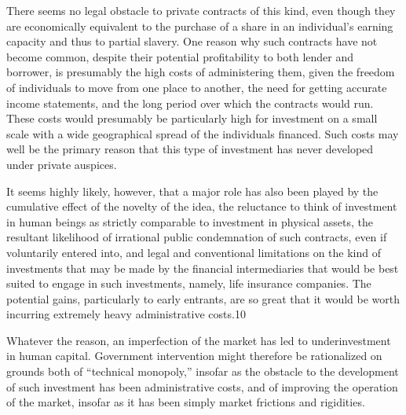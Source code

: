 \documentclass[11pt,openany]{book}
\begin{document}
There seems no legal obstacle to private contracts of this kind, even though they are economically equivalent to the purchase of a share in an individual's earning capacity and thus to partial slavery. One reason why such contracts have not become common, despite their potential profitability to both lender and borrower, is presumably the high costs of administering them, given the freedom of individuals to move from one place to another, the need for getting accurate income statements, and the long period over which the contracts would run. These costs would presumably be particularly high for investment on a small scale with a wide geographical spread of the individuals financed. Such costs may well be the primary reason that this type of investment has never developed under private auspices.

It seems highly likely, however, that a major role has also been played by the cumulative effect of the novelty of the idea, the reluctance to think of investment in human beings as strictly comparable to investment in physical assets, the resultant likelihood of irrational public condemnation of such contracts, even if voluntarily entered into, and legal and conventional limitations on the kind of investments that may be made by the financial intermediaries that would be best suited to engage in such investments, namely, life insurance companies. The potential gains, particularly to early entrants, are so great that it would be worth incurring extremely heavy administrative costs.10

Whatever the reason, an imperfection of the market has led to underinvestment in human capital. Government intervention might therefore be rationalized on grounds both of ``technical monopoly,'' insofar as the obstacle to the development of such investment has been administrative costs, and of improving the operation of the market, insofar as it has been simply market frictions and rigidities.
\end{document}

